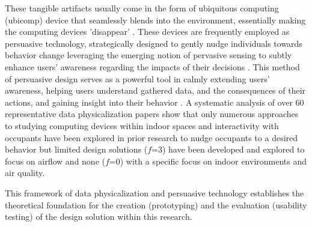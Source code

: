 These tangible artifacts usually come in the form of ubiquitous computing (ubicomp) \cite{bell_yesterdays_2007} device that seamlessly blends into the environment, essentially making the computing devices 'disappear' \cite{weiser_computer_1999}. These devices are frequently employed as persuasive technology, strategically designed to gently nudge individuals towards behavior change leveraging the emerging notion of pervasive sensing to subtly enhance users' awareness regarding the impacts of their decisions \cite{bader_windowwall_2019, rogers_ambient_2010}. This method of persuasive design serves as a powerful tool in calmly extending users' awareness, helping users understand gathered data, and the consequences of their actions, and gaining insight into their behavior \cite{bae_making_2022}. A systematic analysis of over 60 representative data physicalization papers \cite{sauve_physecology_2022} show that only numerous approaches to studying computing devices within indoor spaces and interactivity with occupants have been explored in prior research to nudge occupants to a desired behavior but limited design solutions ($f$=3) have been developed and explored to focus on airflow and none ($f$=0) with a specific focus on indoor environments and air quality. 

This framework of data physicalization and persuasive technology establishes the theoretical foundation for the creation (prototyping) and the evaluation (usability testing) of the design solution within this research.
